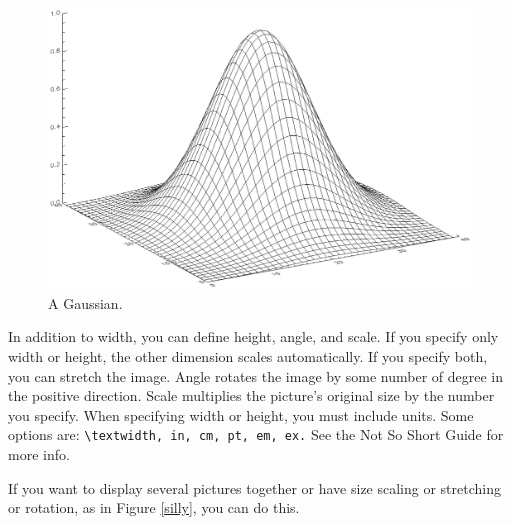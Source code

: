 \documentclass[12pt,preprint]{aastex}
\begin{document}
\begin{figure}[h!]
\begin{center}
\includegraphics[width=.6\textwidth]{2dgaussian.ps}
\caption{A Gaussian. \label{gaussfig}}
\end{center}
\end{figure}

In addition to width, you can define height, angle, and scale.  If you
specify only width or height, the other dimension scales automatically.
If you specify both, you can stretch the image.  Angle rotates the image
by some number of degree in the positive direction. Scale multiplies the
picture's original size by the number you specify.
When specifying width or height, you must include units.  Some options
are: {\tt \verb&\&textwidth, in, cm, pt, em, ex.} See the Not So Short Guide for more
info.

If you want to display several pictures together or have size scaling or
stretching or rotation, as in Figure \ref{silly}, you can do this.
\end{document}
